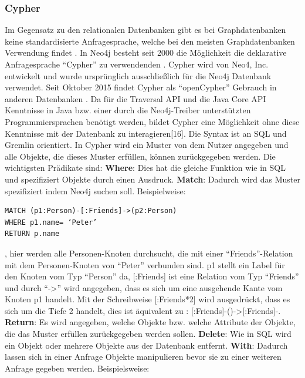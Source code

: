 \subsubsection{Cypher}
Im Gegensatz zu den relationalen Datenbanken gibt es bei Graphdatenbanken keine standardisierte Anfragesprache, welche bei den meisten Graphdatenbanken Verwendung findet \parencite{han2011survey}. In Neo4j besteht seit 2000 die Möglichkeit die deklarative Anfragesprache “Cypher” zu verwendenden  \parencite{francis2018cypher}. Cypher wird von Neo4, Inc. entwickelt und wurde ursprünglich ausschließlich für die Neo4j Datenbank verwendet. Seit Oktober 2015  findet Cypher als “openCypher” Gebrauch in anderen Datenbanken \parencite{francis2018cypher}. Da für die Traversal API und die Java Core API Kenntnisse in Java bzw. einer durch die Neo4j-Treiber unterstützten Programmiersprachen benötigt werden, bildet Cypher eine Möglichkeit ohne diese Kenntnisse mit der Datenbank zu interagieren[16]. Die Syntax ist an SQL und Gremlin \parencite{vukotic2015neo4j} orientiert. In Cypher wird ein Muster von dem Nutzer angegeben und alle Objekte, die dieses Muster erfüllen, können zurückgegeben werden. Die wichtigsten  Prädikate sind: \newline
\textbf{Where}: Dies hat die gleiche Funktion wie in SQL und spezifiziert Objekte durch einen Ausdruck. \newline
\textbf{Match}: Dadurch wird das Muster spezifiziert indem Neo4j suchen soll. Beispielweise: 
\begin{Verbatim}[frame=single]
MATCH (p1:Person)-[:Friends]->(p2:Person) 
WHERE p1.name= ‘Peter’ 
RETURN p.name
\end{Verbatim}
, hier werden alle Personen-Knoten durchsucht, die mit einer “Friends”-Relation mit dem Personen-Knoten von “Peter” verbunden sind. p1 stellt ein Label für den Knoten vom Typ “Person” da, [:Friends] ist eine Relation vom Typ “Friends” und durch “->” wird angegeben, dass es sich um eine ausgehende Kante vom Knoten p1 handelt. Mit der Schreibweise [:Friends*2] wird ausgedrückt, dass es sich um die Tiefe 2 handelt, dies ist äquivalent zu : [:Friends]-()->[:Friends]-. \newline
\textbf{Return}: Es wird angegeben, welche Objekte bzw. welche Attribute der Objekte, die das Muster erfüllen zurückgegeben werden sollen.\newline
\textbf{Delete}: Wie in SQL  wird ein Objekt  oder mehrere Objekte aus der Datenbank entfernt.\newline
\textbf{With}: Dadurch lassen sich in einer Anfrage Objekte manipulieren bevor sie zu einer weiteren Anfrage gegeben werden. Beispielsweise:
